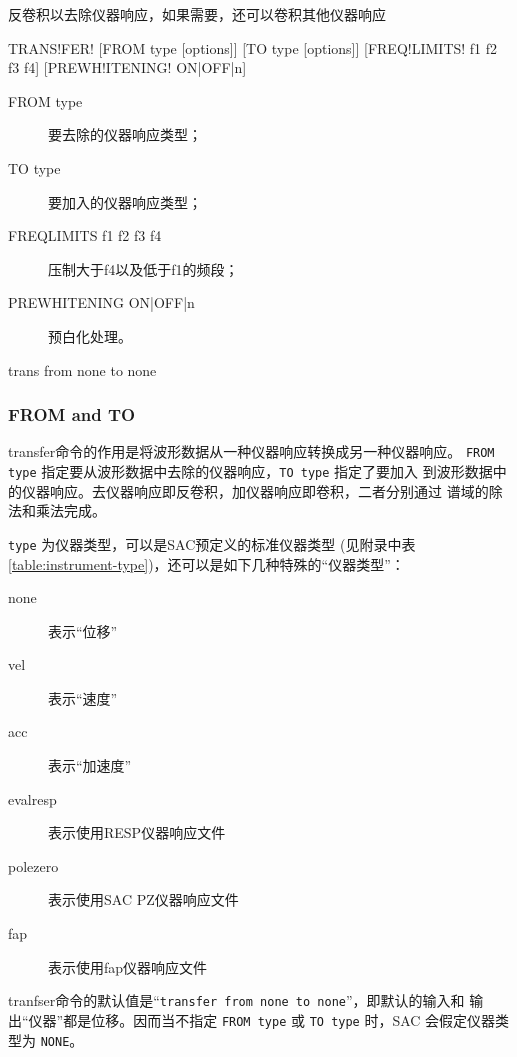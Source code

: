 \label{cmd:transfer}

反卷积以去除仪器响应，如果需要，还可以卷积其他仪器响应

\begin{SACSTX}
TRANS!FER! [FROM type [options]] [TO type [options]]
    [FREQ!LIMITS! f1 f2 f3 f4] [PREWH!ITENING! ON|OFF|n]
\end{SACSTX}

\begin{description}
\item [FROM type] 要去除的仪器响应类型；
\item [TO type] 要加入的仪器响应类型；
\item [FREQLIMITS f1 f2 f3 f4] 压制大于f4以及低于f1的频段；
\item [PREWHITENING ON|OFF|n] 预白化处理。
\end{description}

\begin{SACDFT}
trans from none to none
\end{SACDFT}

\subsubsection{FROM and TO}
transfer命令的作用是将波形数据从一种仪器响应转换成另一种仪器响应。
\texttt{FROM type} 指定要从波形数据中去除的仪器响应，\texttt{TO type} 指定了要加入
到波形数据中的仪器响应。去仪器响应即反卷积，加仪器响应即卷积，二者分别通过
谱域的除法和乘法完成。

\texttt{type} 为仪器类型，可以是SAC预定义的标准仪器类型
(见附录中表 \ref{table:instrument-type})，还可以是如下几种特殊的``仪器类型''：
\begin{description}
\item [none] 表示``位移''
\item [vel] 表示``速度''
\item [acc] 表示``加速度''
\item [evalresp] 表示使用RESP仪器响应文件
\item [polezero] 表示使用SAC PZ仪器响应文件
\item [fap] 表示使用fap仪器响应文件
\end{description}

tranfser命令的默认值是``\texttt{transfer from none to none}''，即默认的输入和
输出``仪器''都是位移。因而当不指定 \texttt{FROM type} 或 \texttt{TO type} 时，SAC
会假定仪器类型为 \texttt{NONE}。

